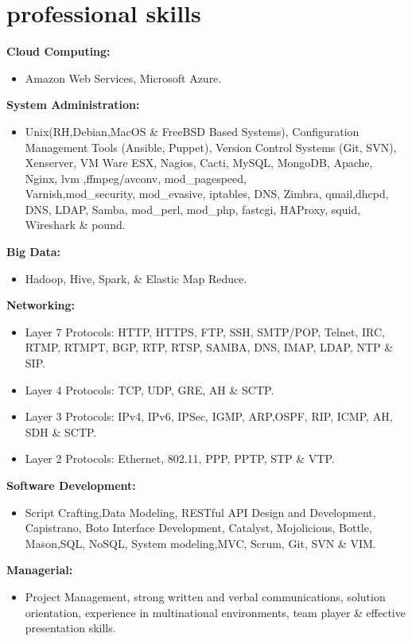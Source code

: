 \documentclass[]{friggeri-cv} %
\begin{document}
\section{professional skills}
{\large \textbf{Cloud Computing:}}
\begin{itemize}
\item Amazon Web Services, Microsoft Azure.   
\end{itemize}
{\large \textbf{System Administration:}}
\begin{itemize}
\item Unix(RH,Debian,MacOS \& FreeBSD Based Systems), Configuration Management Tools (Ansible, Puppet), Version Control Systems (Git, SVN), Xenserver, VM Ware ESX, Nagios, Cacti, MySQL, MongoDB, Apache, Nginx, lvm ,ffmpeg/avconv, mod\_pagespeed, \\ 
Varnish,mod\_security, mod\_evasive, iptables, DNS, Zimbra, qmail,dhcpd, DNS, LDAP, Samba, mod\_perl, mod\_php, fastcgi, HAProxy, squid, Wireshark \& pound.  
\end{itemize}
{\large \textbf{Big Data:}}
\begin{itemize}
\item Hadoop, Hive, Spark, \& Elastic Map Reduce.   
\end{itemize}
{\large \textbf{Networking:}}
\begin{itemize}
\item Layer 7 Protocols: HTTP, HTTPS, FTP, SSH, SMTP/POP, Telnet, IRC, RTMP, RTMPT, BGP, RTP, RTSP, SAMBA, DNS, IMAP, LDAP, NTP \& SIP. 
\item Layer 4 Protocols: TCP, UDP, GRE, AH \& SCTP.
\item Layer 3 Protocols: IPv4, IPv6, IPSec, IGMP, ARP,OSPF, RIP, ICMP, AH, SDH \& SCTP.
\item Layer 2 Protocols: Ethernet, 802.11, PPP, PPTP, STP \& VTP.
\end{itemize}
{\large \textbf{Software Development:}}
\begin{itemize}
\item Script Crafting,Data Modeling, RESTful API Design and Development, Capistrano, Boto Interface Development, Catalyst, Mojolicious, Bottle, Mason,SQL, NoSQL, System modeling,MVC, Scrum, Git, SVN \& VIM.
\end{itemize}
{\large \textbf{Managerial:}}
\begin{itemize}
\item Project Management, strong written and verbal communications, solution orientation, experience in multinational environments, team player  \& effective presentation skills. 
\end{itemize}
\end{document}
